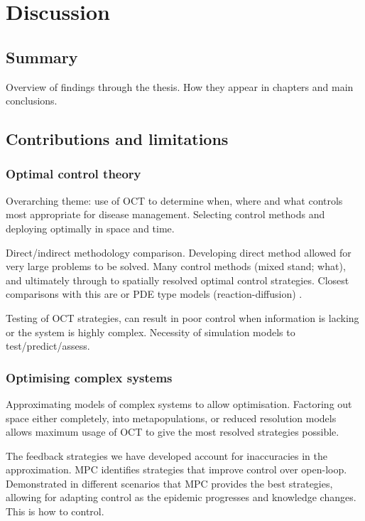 %
\chapter{Discussion\label{ch:discussion}}

\section{Summary}

Overview of findings through the thesis. How they appear in chapters and main conclusions.

\section{Contributions and limitations}

\subsection{Optimal control theory}

Overarching theme: use of OCT to determine when, where and what controls most appropriate for disease management. Selecting control methods and deploying optimally in space and time.

Direct/indirect methodology comparison. Developing direct method allowed for very large problems to be solved. Many control methods (mixed stand; what), and ultimately through to spatially resolved optimal control strategies. Closest comparisons with this are \citet{epanchin_optimal_2012} or PDE type models (reaction-diffusion) \citep[e.g.][]{miyaoka_optimal_2019, neilan_optimal_2011, christley_optimal_2016}.

Testing of OCT strategies, can result in poor control when information is lacking or the system is highly complex. Necessity of simulation models to test/predict/assess.

\subsection{Optimising complex systems}

Approximating models of complex systems to allow optimisation. Factoring out space either completely, into metapopulations, or reduced resolution models allows maximum usage of OCT to give the most resolved strategies possible.

The feedback strategies we have developed account for inaccuracies in the approximation. MPC identifies strategies that improve control over open-loop. Demonstrated in different scenarios that MPC provides the best strategies, allowing for adapting control as the epidemic progresses and knowledge changes. This is how to control.

